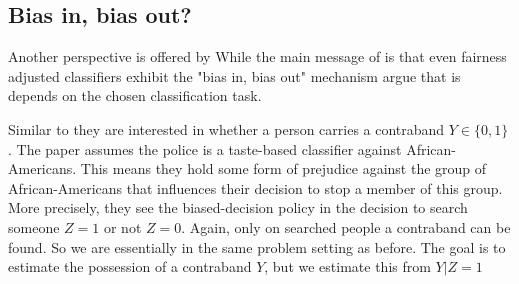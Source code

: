 \subsection{Bias in, bias out?}

Another perspective is offered by \cite{RambachanBBOEFW}
While the main message of \cite{kallus2018} is that even fairness adjusted classifiers exhibit the "bias in, bias out" mechanism \cite{RambachanBBOEFW} argue that is depends on the chosen classification task.

Similar to \cite{kallus2018} they are interested in whether a person carries a contraband $Y \in \{0, 1\}$. The paper assumes the police is a taste-based classifier against African-Americans. This means they hold some form of prejudice against the group of African-Americans that influences their decision to stop a member of this group. More precisely, they see the biased-decision policy in the decision to search someone $Z = 1$ or not $Z = 0$. Again, only on searched people a contraband can be found. So we are essentially in the same problem setting as before. The goal is to estimate the possession of a contraband $Y$, but we estimate this from $Y | Z = 1$

